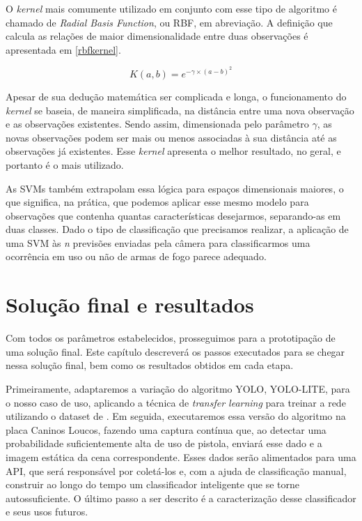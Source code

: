 \documentclass[]{politex}
\begin{document}
O \textit{kernel} mais comumente utilizado em conjunto com esse tipo de algoritmo é chamado de \textit{Radial Basis Function}, ou RBF, em abreviação. A definição que calcula as relações de maior dimensionalidade entre duas observações é apresentada em \ref{rbfkernel}.

\begin{equation}
  K(a,b) = e^{-\gamma \times (a-b)^{2}}
  \label{rbfkernel}
\end{equation}

Apesar de sua dedução matemática ser complicada e longa, o funcionamento do \textit{kernel} se baseia, de maneira simplificada, na distância entre uma nova observação e as observações existentes. Sendo assim, dimensionada pelo parâmetro $\mathit{\gamma}$, as novas observações podem ser mais ou menos associadas à sua distância até as observações já existentes. Esse \textit{kernel} apresenta o melhor resultado, no geral, e portanto é o mais utilizado.

As SVMs também extrapolam essa lógica para espaços dimensionais maiores, o que significa, na prática, que podemos aplicar esse mesmo modelo para observações que contenha quantas características desejarmos, separando-as em duas classes. Dado o tipo de classificação que precisamos realizar, a aplicação de uma SVM às \textit{n} previsões enviadas pela câmera para classificarmos uma ocorrência em uso ou não de armas de fogo parece adequado.

\chapter{Solução final e resultados}

Com todos os parâmetros estabelecidos, prosseguimos para a prototipação de uma solução final. Este capítulo descreverá os passos executados para se chegar nessa solução final, bem como os resultados obtidos em cada etapa.

Primeiramente, adaptaremos a variação do algoritmo YOLO, YOLO-LITE, para o nosso caso de uso, aplicando a técnica de \textit{transfer learning} para treinar a rede utilizando o dataset de \citeyear{olmos1} \citeauthor{olmos1}. Em seguida, executaremos essa versão do algoritmo na placa Caninos Loucos, fazendo uma captura contínua que, ao detectar uma probabilidade suficientemente alta de uso de pistola, enviará esse dado e a imagem estática da cena correspondente. Esses dados serão alimentados para uma API, que será responsável por coletá-los e, com a ajuda de classificação manual, construir ao longo do tempo um classificador inteligente que se torne autossuficiente. O último passo a ser descrito é a caracterização desse classificador e seus usos futuros.
\end{document}

